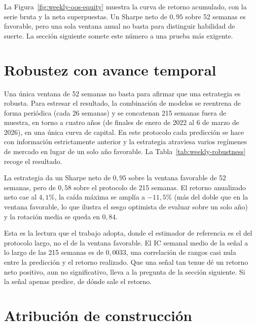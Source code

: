 La Figura~\ref{fig:weekly-oos-equity} muestra la curva de retorno acumulado, con la serie
bruta y la neta superpuestas. Un Sharpe neto de $0{,}95$ sobre 52 semanas es favorable, pero una sola ventana anual no
basta para distinguir habilidad de suerte. La sección siguiente somete este número a una
prueba más exigente.

\section{Robustez con avance temporal}\label{sec:p2-robustez}

Una única ventana de 52 semanas no basta para afirmar que una estrategia es robusta. Para
estresar el resultado, la combinación de modelos se reentrena de forma periódica (cada 26
semanas) y se concatenan 215 semanas fuera de muestra, en torno a cuatro años (de finales
de enero de 2022 al 6 de marzo de 2026), en una única curva de capital. En este protocolo
cada predicción se hace con información estrictamente anterior y la estrategia atraviesa
varios regímenes de mercado en lugar de un solo año favorable. La
Tabla~\ref{tab:weekly-robustness} recoge el resultado.



La estrategia da un Sharpe neto de $0{,}95$ sobre la ventana favorable de 52 semanas, pero
de $0{,}58$ sobre el protocolo de 215 semanas. El retorno anualizado neto cae al
$4{,}1\%$, la caída máxima se amplía a $-11{,}5\%$ (más del doble que en la ventana
favorable, lo que ilustra el sesgo optimista de evaluar sobre un solo año) y la rotación
media se queda en $0{,}84$.

Esta es la lectura que el trabajo adopta, donde el estimador de referencia es el del protocolo
largo, no el de la ventana favorable. El IC semanal medio de la señal a lo largo de las
215 semanas es de $0{,}0033$, una correlación de rangos casi nula entre la predicción y el
retorno realizado. Que una señal tan tenue dé un retorno neto positivo, aun no
significativo, lleva a la pregunta de la sección siguiente. Si la señal apenas predice, de
dónde sale el retorno.

\section{Atribución de construcción}\label{sec:p2-atribucion}

